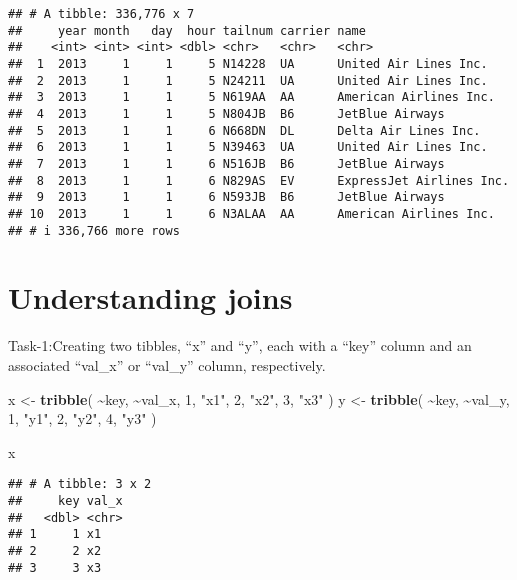 \documentclass[
]{article}
\newenvironment{Shaded}{\begin{snugshade}}{\end{snugshade}}
\newcommand{\DecValTok}[1]{\textcolor[rgb]{0.00,0.00,0.81}{#1}}
\newcommand{\FunctionTok}[1]{\textcolor[rgb]{0.13,0.29,0.53}{\textbf{#1}}}
\newcommand{\NormalTok}[1]{#1}
\newcommand{\OtherTok}[1]{\textcolor[rgb]{0.56,0.35,0.01}{#1}}
\newcommand{\SpecialCharTok}[1]{\textcolor[rgb]{0.81,0.36,0.00}{\textbf{#1}}}
\newcommand{\StringTok}[1]{\textcolor[rgb]{0.31,0.60,0.02}{#1}}
\begin{document}
\begin{verbatim}
## # A tibble: 336,776 x 7
##     year month   day  hour tailnum carrier name                    
##    <int> <int> <int> <dbl> <chr>   <chr>   <chr>                   
##  1  2013     1     1     5 N14228  UA      United Air Lines Inc.   
##  2  2013     1     1     5 N24211  UA      United Air Lines Inc.   
##  3  2013     1     1     5 N619AA  AA      American Airlines Inc.  
##  4  2013     1     1     5 N804JB  B6      JetBlue Airways         
##  5  2013     1     1     6 N668DN  DL      Delta Air Lines Inc.    
##  6  2013     1     1     5 N39463  UA      United Air Lines Inc.   
##  7  2013     1     1     6 N516JB  B6      JetBlue Airways         
##  8  2013     1     1     6 N829AS  EV      ExpressJet Airlines Inc.
##  9  2013     1     1     6 N593JB  B6      JetBlue Airways         
## 10  2013     1     1     6 N3ALAA  AA      American Airlines Inc.  
## # i 336,766 more rows
\end{verbatim}

\hypertarget{understanding-joins}{%
\section{Understanding joins}\label{understanding-joins}}

Task-1:Creating two tibbles, ``x'' and ``y'', each with a ``key'' column
and an associated ``val\_x'' or ``val\_y'' column, respectively.

\begin{Shaded}
\begin{Highlighting}[]
\NormalTok{x }\OtherTok{\textless{}{-}} \FunctionTok{tribble}\NormalTok{(}
  \SpecialCharTok{\textasciitilde{}}\NormalTok{key, }\SpecialCharTok{\textasciitilde{}}\NormalTok{val\_x,}
     \DecValTok{1}\NormalTok{, }\StringTok{"x1"}\NormalTok{,}
     \DecValTok{2}\NormalTok{, }\StringTok{"x2"}\NormalTok{,}
     \DecValTok{3}\NormalTok{, }\StringTok{"x3"}
\NormalTok{)}
\NormalTok{y }\OtherTok{\textless{}{-}} \FunctionTok{tribble}\NormalTok{(}
  \SpecialCharTok{\textasciitilde{}}\NormalTok{key, }\SpecialCharTok{\textasciitilde{}}\NormalTok{val\_y,}
     \DecValTok{1}\NormalTok{, }\StringTok{"y1"}\NormalTok{,}
     \DecValTok{2}\NormalTok{, }\StringTok{"y2"}\NormalTok{,}
     \DecValTok{4}\NormalTok{, }\StringTok{"y3"}
\NormalTok{)}

\NormalTok{x}
\end{Highlighting}
\end{Shaded}

\begin{verbatim}
## # A tibble: 3 x 2
##     key val_x
##   <dbl> <chr>
## 1     1 x1   
## 2     2 x2   
## 3     3 x3
\end{verbatim}
\end{document}
